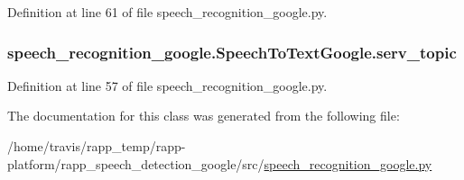 Definition at line 61 of file speech\-\_\-recognition\-\_\-google.\-py.

\hypertarget{classspeech__recognition__google_1_1SpeechToTextGoogle_a706a8904bbb7ae3e7431250323b559d6}{
\subsubsection[{serv\-\_\-topic}]{\setlength{\rightskip}{0pt plus 5cm}speech\-\_\-recognition\-\_\-google.\-Speech\-To\-Text\-Google.\-serv\-\_\-topic}}\label{classspeech__recognition__google_1_1SpeechToTextGoogle_a706a8904bbb7ae3e7431250323b559d6}


Definition at line 57 of file speech\-\_\-recognition\-\_\-google.\-py.



The documentation for this class was generated from the following file\-:\begin{DoxyCompactItemize}
\item 
/home/travis/rapp\-\_\-temp/rapp-\/platform/rapp\-\_\-speech\-\_\-detection\-\_\-google/src/\hyperlink{speech__recognition__google_8py}{speech\-\_\-recognition\-\_\-google.\-py}\end{DoxyCompactItemize}
